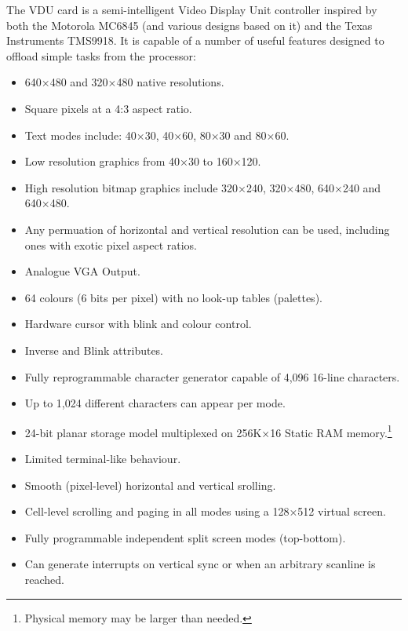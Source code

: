 
\label{chap:hard-vdu}

The VDU card is a semi-intelligent Video Display Unit controller inspired by
both the Motorola MC6845 (and various designs based on it) and the Texas
Instruments TMS9918. It is capable of a number of useful features designed to
offload simple tasks from the processor:

\begin{itemize}
\item 640×480 and 320×480 native resolutions.
\item Square pixels at a 4:3 aspect ratio.
\item Text modes include: 40×30, 40×60, 80×30 and 80×60.
\item Low resolution graphics from 40×30 to 160×120.
\item High resolution bitmap graphics include 320×240, 320×480, 640×240 and
  640×480.
\item Any permuation of horizontal and vertical resolution can be used,
  including ones with exotic pixel aspect ratios.
\item Analogue VGA Output.
\item 64 colours (6 bits per pixel) with no look-up tables (palettes).
\item Hardware cursor with blink and colour control.
\item Inverse and Blink attributes.
\item Fully reprogrammable character generator capable of 4,096 16-line
  characters.
\item Up to 1,024 different characters can appear per mode.
\item 24-bit planar storage model multiplexed on 256K×16 Static RAM memory.\footnote{Physical memory may be larger than needed.}
\item Limited terminal-like behaviour.
\item Smooth (pixel-level) horizontal and vertical srolling.
\item Cell-level scrolling and paging in all modes using a 128×512 virtual
  screen.
\item Fully programmable independent split screen modes (top-bottom).
\item Can generate interrupts on vertical sync or when an arbitrary scanline is
  reached.
\end{itemize}

